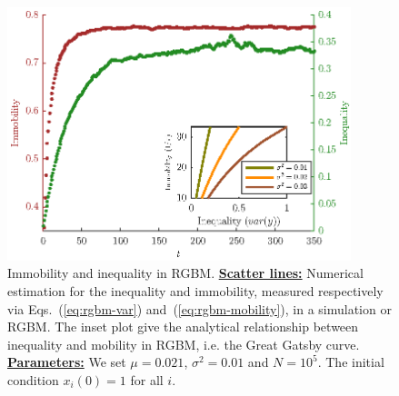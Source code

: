 \documentclass[11pt]{article}
\numberwithin{equation}{section}
\begin{document}
\begin{figure}[t!]
\includegraphics[width=10cm]{figs/fig0.eps}
\caption{Immobility and inequality in RGBM. \underline{\textbf{Scatter lines:}} Numerical estimation for the inequality and immobility, measured respectively via Eqs.~(\ref{eq:rgbm-var}) and~(\ref{eq:rgbm-mobility}), in a simulation or RGBM. The inset plot give the analytical relationship between inequality and mobility in RGBM, i.e. the Great Gatsby curve. \underline{\textbf{Parameters:}} We set $\mu = 0.021$, $\sigma^2 = 0.01$ and $N = 10^5$. The initial condition $x_i(0) = 1$ for all $i$.\label{fig:rgbm-ineq-mobility}}
\end{figure}






\end{document}
